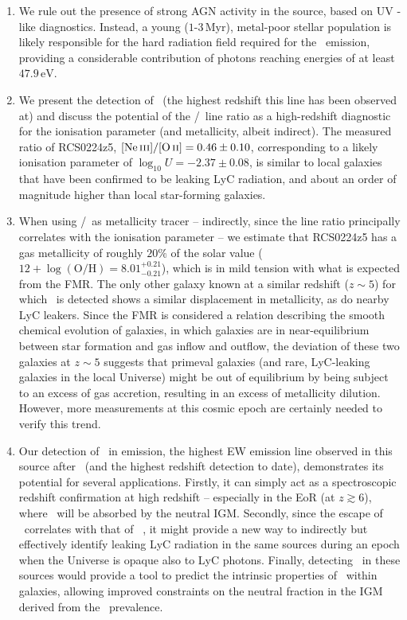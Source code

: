 \begin{enumerate}[label=(\roman*)]
    \item We rule out the presence of strong AGN activity in the source, based on UV -like diagnostics. Instead, a young ($1$-$3 \, \mathrm{Myr}$), metal-poor stellar population is likely responsible for the hard radiation field required for the \CIV\ emission, providing a considerable contribution of photons reaching energies of at least $47.9 \, \mathrm{eV}$.
    
    \item We present the detection of \NeIII\ (the highest redshift this line has been observed at) and discuss the potential of the \NeIII/\OII\ line ratio as a high-redshift diagnostic for the ionisation parameter (and metallicity, albeit indirect). The measured ratio of RCS0224z5, $\NeIII/\OII = 0.46 \pm 0.10$, corresponding to a likely ionisation parameter of $\log_{10} U = -2.37 \pm 0.08$, is similar to local galaxies that have been confirmed to be leaking LyC radiation, and about an order of magnitude higher than local star-forming galaxies.
    
    \item When using \NeIII/\OII\ as metallicity tracer -- indirectly, since the line ratio principally correlates with the ionisation parameter -- we estimate that RCS0224z5 has a gas metallicity of roughly $20\%$ of the solar value ($12 + \log \left ( \text{O/H} \right) = 8.01_{-0.21}^{+0.21}$), which is in mild tension with what is expected from the FMR. The only other galaxy known at a similar redshift ($z \sim 5$) for which \NeIII\ is detected shows a similar displacement in metallicity, as do nearby LyC leakers. Since the FMR is considered a relation describing the smooth chemical evolution of galaxies, in which galaxies are in near-equilibrium between star formation and gas inflow and outflow, the deviation of these two galaxies at $z \sim 5$ suggests that primeval galaxies (and rare, LyC-leaking galaxies in the local Universe) might be out of equilibrium by being subject to an excess of gas accretion, resulting in an excess of metallicity dilution. However, more measurements at this cosmic epoch are certainly needed to verify this trend.
    
    \item Our detection of \MgII\ in emission, the highest EW emission line observed in this source after \lya\ (and the highest redshift detection to date), demonstrates its potential for several applications. Firstly, it can simply act as a spectroscopic redshift confirmation at high redshift -- especially in the EoR (at $z \gtrsim 6$), where \lya\ will be absorbed by the neutral IGM. Secondly, since the escape of \MgII\ correlates with that of \lya\ \citep{2018ApJ...855...96H}, it might provide a new way to indirectly but effectively identify leaking LyC radiation in the same sources during an epoch when the Universe is opaque also to LyC photons. Finally, detecting \MgII\ in these sources would provide a tool to predict the intrinsic properties of \lya\ within galaxies, allowing improved constraints on the neutral fraction in the IGM derived from the \lya\ prevalence.
\end{enumerate}

